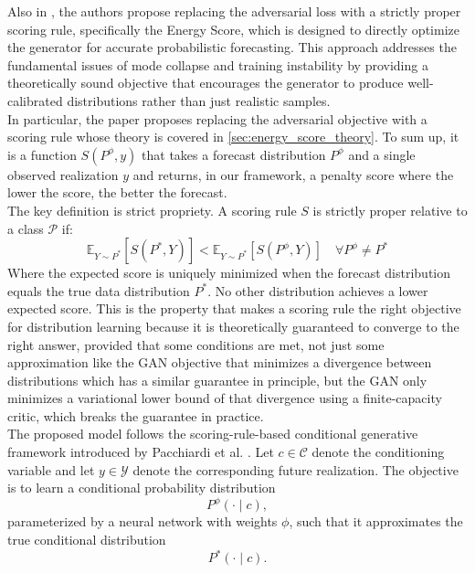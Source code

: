 Also in \cite{srforgan:srforgan}, the authors propose replacing the adversarial loss with a strictly proper scoring rule, specifically the Energy Score, which is designed to directly optimize the generator for accurate probabilistic forecasting.
This approach addresses the fundamental issues of mode collapse and training instability by providing a theoretically sound objective that encourages the generator to produce well-calibrated distributions rather than just realistic samples.\\

In particular, the paper proposes replacing the adversarial objective with a scoring rule whose theory is covered in \ref{sec:energy_score_theory}.
To sum up, it is a function $S(P^\phi, y)$ 
that takes a forecast distribution $P^\phi$ and a single observed realization $y$ and returns, in our framework, a penalty score where the lower the score, the better the forecast.\\
The key definition is strict propriety. A scoring rule $S$ is strictly proper relative to a class $\mathcal{P}$ if:
$$\mathbb{E}_{Y \sim P^*}[S(P^*, Y)] < \mathbb{E}_{Y \sim P^*}[S(P^\phi, Y)] \quad \forall P^\phi \neq P^*$$
Where the expected score is uniquely minimized when the forecast distribution equals the true data distribution $P^*$. No other distribution achieves a lower expected score. This is the property that makes a scoring rule the right objective for distribution learning because
it is theoretically guaranteed to converge to the right answer, provided that some conditions are met, not just some approximation like the 
GAN objective that minimizes a divergence between distributions which has a similar guarantee in principle, but the GAN only minimizes a variational lower bound of that divergence using a finite-capacity critic, which breaks the guarantee in practice.\\





The proposed model follows the scoring-rule-based conditional generative framework introduced by Pacchiardi et al. \cite{srforgan:srforgan}. Let $c\in\mathcal{C}$ denote the conditioning variable and let $y\in\mathcal{Y}$ denote the corresponding future realization. The objective is to learn a conditional probability distribution
\[
P^\phi(\cdot\mid c),
\]
parameterized by a neural network with weights $\phi$, such that it approximates the true conditional distribution
\[
P^*(\cdot\mid c).
\]

